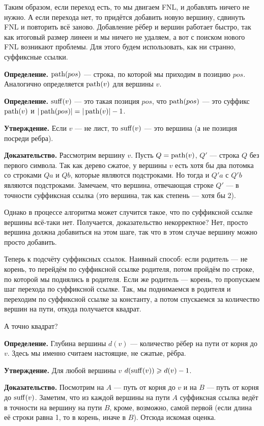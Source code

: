Таким образом, если переход есть, то мы двигаем FNL, и добавлять ничего не нужно.
А если перехода нет, то придётся добавить новую вершину, сдвинуть FNL и повторить всё заново.
Добавление рёбер и вершин работает быстро, так как итоговый размер линеен и мы ничего не удаляем, а вот с поиском нового FNL возникают проблемы.
Для этого будем использовать, как ни странно, суффиксные ссылки.

\textbf{Определение.} $\operatorname{path}(pos)$ --- строка, по которой мы приходим в позицию $pos$.
Аналогично определяется $\operatorname{path}(v)$ для вершины $v$.

\textbf{Определение.} $\operatorname{suff}(v)$ --- это такая позиция $pos$, что $\operatorname{path}(pos)$ --- это суффикс $\operatorname{path}(v)$ и $|\operatorname{path}(pos)| = |\operatorname{path}(v)| - 1$.

\textbf{Утверждение.} Если $v$ --- не лист, то $\operatorname{suff}(v)$ --- это вершина (а не позиция посреди ребра).

\textbf{Доказательство.} Рассмотрим вершину $v$. Пусть $Q = \operatorname{path}(v)$, $Q'$ --- строка $Q$ без первого символа.
Так как дерево сжатое, у вершины $v$ есть хотя бы два потомка со строками $Qa$ и $Qb$, которые являются подстроками.
Но тогда и $Q'a$ с $Q'b$ являются подстроками.
Замечаем, что вершина, отвечающая строке $Q'$ --- в точности суффиксная ссылка (это вершина, так как степень --- хотя бы 2).

Однако в процессе алгоритма может случится такое, что по суффиксной ссылке вершины всё-таки нет.
Получается, доказательство некорректное? Нет, просто вершина должна добавиться на этом шаге, так что в этом случае вершину можно просто добавить.

Теперь к подсчёту суффиксных ссылок.
Наивный способ: если родитель --- не корень, то перейдём по суффиксной ссылке родителя, потом пройдём по строке, по которой мы поднялись в родителя.
Если же родитель --- корень, то пропускаем шаг перехода по суффиксной ссылке.
Так, мы поднимаемся в родителя и переходим по суффиксной ссылке за константу, а потом спускаемся за количество вершин на пути, откуда получается квадрат.

А точно квадрат?

\textbf{Определение.} Глубина вершины $d(v)$ --- количество рёбер на пути от корня до $v$. Здесь мы именно считаем настоящие, не сжатые, рёбра.

\textbf{Утверждение.} Для любой вершины $v$ $d(\operatorname{suff}(v)) \geqslant d(v) - 1$.

\textbf{Доказательство.} Посмотрим на $A$ --- путь от корня до $v$ и на $B$ --- путь от корня до $\operatorname{suff}(v)$.
Заметим, что из каждой вершины на пути $A$ суффиксная ссылка ведёт в точности на вершину на пути $B$, кроме, возможно, самой первой (если длина её строки равна 1, то в корень, иначе в $B$).
Отсюда искомая оценка.

